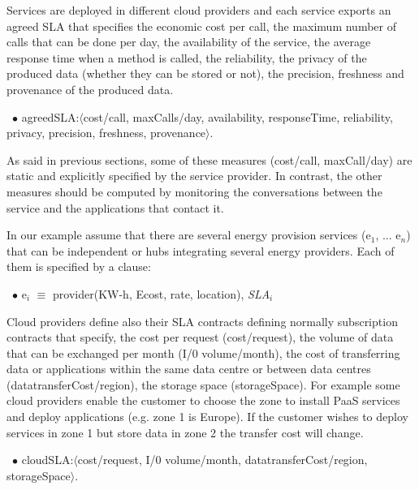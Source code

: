 Services are deployed in different cloud providers and each service exports an agreed SLA that specifies the economic cost per call, the maximum number of calls that can be done per day, the availability of the service, the average response time when a method is called, the reliability, the privacy of the produced data (whether they can be stored or not), the precision, freshness and provenance of the produced data. 

\begin{trivlist}\sf\footnotesize
\item[~$\bullet$ ] {\sf agreedSLA:$\langle$cost/call, maxCalls/day, availability, responseTime, reliability, privacy, precision, freshness, provenance$\rangle$}. 
 \end{trivlist}
 
As said in previous sections, some of these measures ({\sf cost/call, maxCall/day}) are static and explicitly specified by the service provider. 
In contrast, the other measures should be computed by monitoring the conversations between the service and the applications that contact it.  

In our example assume that there are several energy provision services ({\sf e$_1$, ... e$_n$}) that can be independent or hubs integrating several energy providers. 
Each of them is specified by a clause:
\begin{trivlist}\sf\footnotesize
\item[~$\bullet$ ]   e$_i$ $\equiv$ provider(KW-h, Ecost, rate, location), \textit{SLA}$_i$
\end{trivlist}

Cloud providers define also their SLA contracts defining normally subscription contracts that specify, the cost per request ({\sf cost/request}), the volume of data that can be exchanged per month ({\sf I/0 volume/month}), the cost of transferring data or applications within the same data centre or between data centres ({\sf datatransferCost/region}), the storage space ({\sf storageSpace}). For example some cloud providers enable the customer to choose the zone to install PaaS services and deploy applications (e.g. zone 1 is Europe). If the customer wishes to deploy services in zone 1 but store data in zone 2 the transfer cost will change.

\begin{trivlist}\sf\footnotesize
% 
 \item[~$\bullet$ ]  {\sf cloudSLA:$\langle$cost/request, I/0 volume/month, datatransferCost/region, storageSpace$\rangle$}. 
 \end{trivlist}
 

